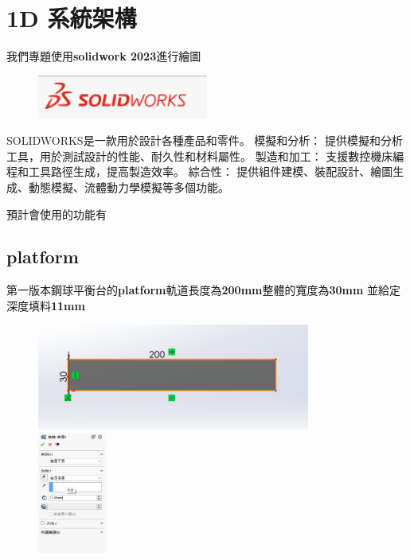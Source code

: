 

\section{1D 系統架構}
我們專題使用\textbf{solidwork 2023}進行繪圖

\begin{figure}[h!]
    \centering
    \includegraphics[width=0.5\textwidth]{./../images/6-1-1.png}
\end{figure}

\noindent SOLIDWORKS是一款用於設計各種產品和零件。 模擬和分析： 提供模擬和分析工具，用於測試設計的性能、耐久性和材料屬性。 製造和加工： 支援數控機床編程和工具路徑生成，提高製造效率。 綜合性： 提供組件建模、裝配設計、繪圖生成、動態模擬、流體動力學模擬等多個功能。

\noindent 預計會使用的功能有


\subsection{platform}
第一版本鋼球平衡台的\textbf{platform}軌道長度為\textbf{200mm}整體的寬度為\textbf{30mm} 並給定深度填料\textbf{11mm}

\begin{figure}[h!]
    \centering
    \includegraphics[width=0.8\textwidth]{./../images/6-1-11.png}
    \includegraphics[width=0.2\textwidth]{./../images/6-1-12.png}
\end{figure}

